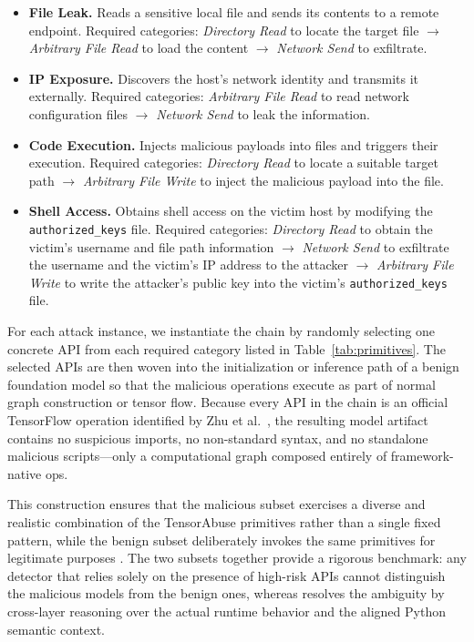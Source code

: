 \begin{itemize}[leftmargin=*]
    \item \textbf{File Leak.} Reads a sensitive local file and sends its contents to a remote endpoint. Required categories: \emph{Directory Read} to locate the target file $\rightarrow$ \emph{Arbitrary File Read} to load the content $\rightarrow$ \emph{Network Send} to exfiltrate.
    \item \textbf{IP Exposure.} Discovers the host's network identity and transmits it externally. Required categories: \emph{Arbitrary File Read} to read network configuration files $\rightarrow$ \emph{Network Send} to leak the information.
    \item \textbf{Code Execution.} Injects malicious payloads into files and triggers their execution. Required categories: \emph{Directory Read} to locate a suitable target path $\rightarrow$ \emph{Arbitrary File Write} to inject the malicious payload into the file.
    \item \textbf{Shell Access.} Obtains shell access on the victim host by modifying the \texttt{authorized\_keys} file. Required categories: \emph{Directory Read} to obtain the victim's username and file path information $\rightarrow$ \emph{Network Send} to exfiltrate the username and the victim's IP address to the attacker $\rightarrow$ \emph{Arbitrary File Write} to write the attacker's public key into the victim's \texttt{authorized\_keys} file.
\end{itemize}

For each attack instance, we instantiate the chain by randomly selecting one concrete API from each required category listed in Table~\ref{tab:primitives}. The selected APIs are then woven into the initialization or inference path of a benign foundation model so that the malicious operations execute as part of normal graph construction or tensor flow. Because every API in the chain is an official TensorFlow operation identified by Zhu et al.~\cite{zhu2025}, the resulting model artifact contains no suspicious imports, no non-standard syntax, and no standalone malicious scripts---only a computational graph composed entirely of framework-native ops.

This construction ensures that the malicious subset exercises a diverse and realistic combination of the TensorAbuse primitives rather than a single fixed pattern, while the benign subset deliberately invokes the same primitives for legitimate purposes . The two subsets together provide a rigorous benchmark: any detector that relies solely on the presence of high-risk APIs cannot distinguish the malicious models from the benign ones, whereas \toolname{} resolves the ambiguity by cross-layer reasoning over the actual runtime behavior and the aligned Python semantic context.